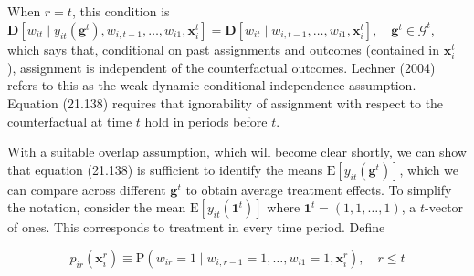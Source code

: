 \documentclass[10pt]{article}
\begin{document}
When $r=t$, this condition is\\
$\mathbf{D}\left[w_{i t} \mid y_{i t}\left(\mathbf{g}^{t}\right), w_{i, t-1}, \ldots, w_{i 1}, \mathbf{x}_{i}^{t}\right]=\mathbf{D}\left[w_{i t} \mid w_{i, t-1}, \ldots, w_{i 1}, \mathbf{x}_{i}^{t}\right], \quad \mathbf{g}^{t} \in \mathscr{G}^{t}$,\\
which says that, conditional on past assignments and outcomes (contained in $\mathbf{x}_{i}^{t}$ ), assignment is independent of the counterfactual outcomes. Lechner (2004) refers to this as the weak dynamic conditional independence assumption. Equation (21.138) requires that ignorability of assignment with respect to the counterfactual at time $t$ hold in periods before $t$.

With a suitable overlap assumption, which will become clear shortly, we can show that equation (21.138) is sufficient to identify the means $\mathrm{E}\left[y_{i t}\left(\mathbf{g}^{t}\right)\right]$, which we can compare across different $\mathbf{g}^{t}$ to obtain average treatment effects. To simplify the notation, consider the mean $\mathrm{E}\left[y_{i t}\left(\mathbf{1}^{t}\right)\right]$ where $\mathbf{1}^{t}=(1,1, \ldots, 1)$, a $t$-vector of ones. This corresponds to treatment in every time period. Define


\begin{equation*}
p_{i r}\left(\mathbf{x}_{i}^{r}\right) \equiv \mathrm{P}\left(w_{i r}=1 \mid w_{i, r-1}=1, \ldots, w_{i 1}=1, \mathbf{x}_{i}^{r}\right), \quad r \leq t \tag{21.139}
\end{equation*}
\end{document}
